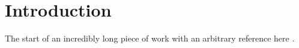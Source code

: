 \chapter{Introduction}
\label{ch:introduction}
The start of an incredibly long piece of work with an arbitrary reference here \cite{knuth:1984}.